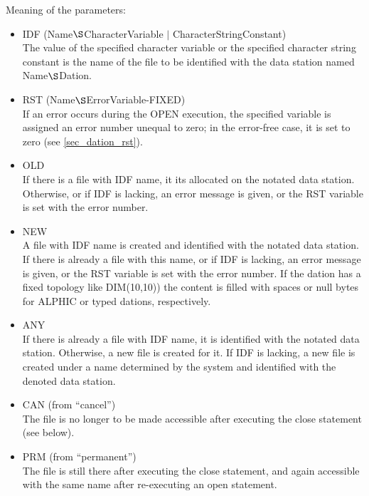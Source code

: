 Meaning of the parameters:
\begin{itemize}
\item IDF (Name$\S $CharacterVariable $\mid$ CharacterStringConstant)
\\
The value of the specified character variable or the specified character
string constant is the name of the file to be identified with the data
station named Name$\S $Dation.
\item RST (Name$\S $ErrorVariable-FIXED)
\\
If an error occurs during the OPEN execution, the specified variable is
assigned an error number unequal to zero; in the error-free case, it is
set to zero (see \ref{sec_dation_rst}).
\item OLD\\
If there is a file with IDF name, it its allocated on the notated data
station. Otherwise, or if IDF is lacking, an error message is given, or
the RST variable is set with the error number.
\item NEW\\
A file with IDF name is created and identified with the notated data
station. If there is already a file with this name, or if IDF is
lacking, an error message is given, or the RST variable is set with the
error number.
If the dation has a fixed topology like DIM(10,10)) the content is
filled with spaces or null bytes for ALPHIC or typed dations, respectively.
\item ANY\\
If there is already a file with IDF name, it is identified with the
notated data station. Otherwise, a new file is created for it. If IDF
is lacking, a new file is created under a name determined by the system
and identified with the denoted data station.
\item CAN (from ``cancel'')\\
The file is no longer to be made accessible after executing the close
statement (see below).
\item PRM (from ``permanent'')\\
The file is still there after executing the close statement, and again
accessible with the same name after re-executing an open statement.
\end{itemize}


